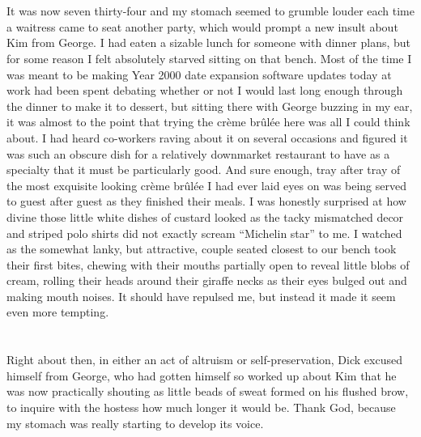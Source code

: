 \documentclass[]{book}
\begin{document}
\chapter{}\label{section-2}

It was now seven thirty-four and my stomach seemed to grumble louder
each time a waitress came to seat another party, which would prompt a
new insult about Kim from George. I had eaten a sizable lunch for
someone with dinner plans, but for some reason I felt absolutely starved
sitting on that bench. Most of the time I was meant to be making Year
2000 date expansion software updates today at work had been spent
debating whether or not I would last long enough through the dinner to
make it to dessert, but sitting there with George buzzing in my ear, it
was almost to the point that trying the crème brûlée here was all I
could think about. I had heard co-workers raving about it on several
occasions and figured it was such an obscure dish for a relatively
downmarket restaurant to have as a specialty that it must be
particularly good. And sure enough, tray after tray of the most
exquisite looking crème brûlée I had ever laid eyes on was being served
to guest after guest as they finished their meals. I was honestly
surprised at how divine those little white dishes of custard looked as
the tacky mismatched decor and striped polo shirts did not exactly
scream ``Michelin star'' to me. I watched as the somewhat lanky, but
attractive, couple seated closest to our bench took their first bites,
chewing with their mouths partially open to reveal little blobs of
cream, rolling their heads around their giraffe necks as their eyes
bulged out and making mouth noises. It should have repulsed me, but
instead it made it seem even more tempting.

\chapter{}\label{section-3}

Right about then, in either an act of altruism or self-preservation,
Dick excused himself from George, who had gotten himself so worked up
about Kim that he was now practically shouting as little beads of sweat
formed on his flushed brow, to inquire with the hostess how much longer
it would be. Thank God, because my stomach was really starting to
develop its voice.

\chapter{}\label{section-4}
\end{document}
